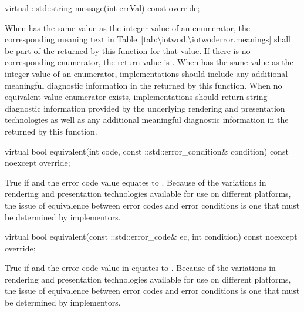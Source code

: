 \begin{itemdecl}
virtual ::std::string message(int errVal) const override;
\end{itemdecl}
\begin{itemdescr}
	\pnum
	\returns
	When  has the same value as the integer value of an 
	 enumerator, the corresponding meaning text in 
	Table~\ref{tab:\iotwod.\iotwoderror.meanings} shall be part of the 
	 returned by this function for that value. If there is no 
	corresponding enumerator, the return value is 
	.
	\enternote
	When  has the same value as the integer value of an 
	 enumerator, implementations should include any 
	additional meaningful diagnostic information in the  returned 
	by this function. When no equivalent value enumerator exists, 
	implementations should return string diagnostic information provided by the 
	underlying rendering and presentation technologies as well as any 
	additional meaningful diagnostic information in the  returned 
	by this function.
	\exitnote
	
\end{itemdescr}

\begin{itemdecl}
virtual bool equivalent(int code,
  const ::std::error_condition& condition) const noexcept override;
\end{itemdecl}
\begin{itemdescr}
	\pnum
	\returns
	True if  and the  error code value  equates to .
	\enternote
	Because of the variations in rendering and presentation technologies 
	available for use on different platforms, the issue of equivalence between 
	error codes and error conditions is one that must be determined by 
	implementors.
	\exitnote
\end{itemdescr}
\begin{itemdecl}
virtual bool equivalent(const ::std::error_code& ec,
  int condition) const noexcept override;
\end{itemdecl}
\begin{itemdescr}
	\pnum
	\returns
	True if  and the  error code value in  equates to .
	\enternote
	Because of the variations in rendering and presentation technologies 
	available for use on different platforms, the issue of equivalence between 
	error codes and error conditions is one that must be determined by 
	implementors.
	\exitnote
\end{itemdescr}

